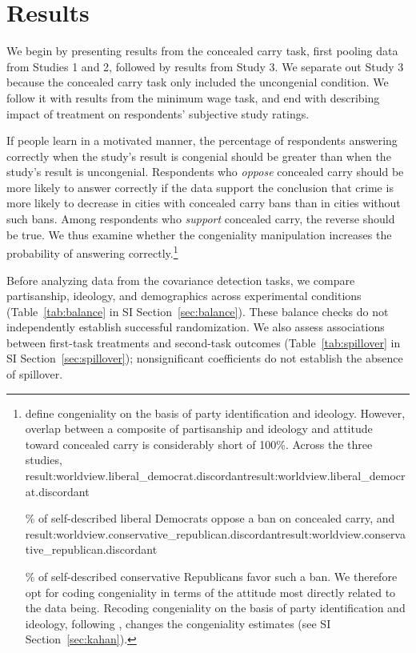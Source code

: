 \documentclass[12pt,letterpaper]{article}
\newcommand{\result}[1]{\ifcsname result:#1\endcsname\csname result:#1\endcsname\else\PackageError{replication}{Missing result #1}{}\fi}
\begin{document}
\section*{Results}

We begin by presenting results from the concealed carry task, first pooling data from Studies 1 and 2, followed by results from Study 3. We separate out Study 3 because the concealed carry task only included the uncongenial condition. We follow it with results from the minimum wage task, and end with describing impact of treatment on respondents' subjective study ratings.

If people learn in a motivated manner, the percentage of respondents answering correctly when the study's result is congenial should be greater than when the study's result is uncongenial. Respondents who {\it oppose} concealed carry should be more likely to answer correctly if the data support the conclusion that crime is more likely to decrease in cities with concealed carry bans than in cities without such bans. Among respondents who {\it support} concealed carry, the reverse should be true. We thus examine whether the congeniality manipulation increases the probability of answering correctly.\footnote{\citet{kahan2017} define congeniality on the basis of party identification and ideology. However, overlap between a composite of partisanship and ideology and attitude toward concealed carry is considerably short of 100\%. Across the three studies, \result{worldview.liberal_democrat.discordant}\% of self-described liberal Democrats oppose a ban on concealed carry, and \result{worldview.conservative_republican.discordant}\% of self-described conservative Republicans favor such a ban. We therefore opt for coding congeniality in terms of the attitude most directly related to the data being. Recoding congeniality on the basis of party identification and ideology, following \citeauthor{kahan2017}, changes the congeniality estimates (see SI Section~\ref{sec:kahan}).}

Before analyzing data from the covariance detection tasks, we compare partisanship, ideology, and demographics across experimental conditions (Table~\ref{tab:balance} in SI Section~\ref{sec:balance}). These balance checks do not independently establish successful randomization. We also assess associations between first-task treatments and second-task outcomes (Table~\ref{tab:spillover} in SI Section~\ref{sec:spillover}); nonsignificant coefficients do not establish the absence of spillover.
 
\end{document}

